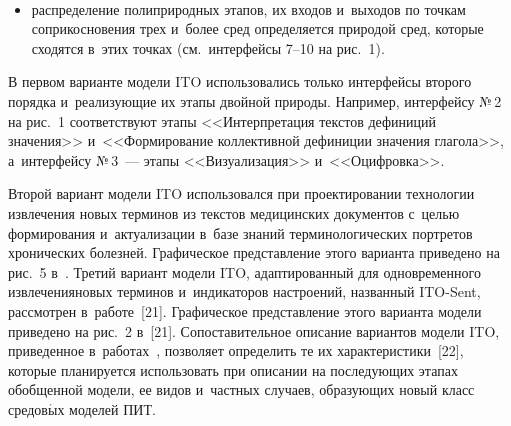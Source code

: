  \setcounter{figure}{1}
  \begin{figure*}[h] %
  \vspace*{-10pt}
  \begin{center}  
    \mbox{%
\epsfxsize=163.291mm
}

\end{center}
\vspace*{-9pt}
  \vspace*{-12pt}
  \end{figure*}
  
  \begin{multicols}{2}

\begin{itemize}
  \item распределение полиприродных этапов, их входов и~выходов по 
точкам соприкосновения трех и~более сред определяется природой сред, 
которые сходятся в~этих точках (см.\ интерфейсы 7--10 на рис.~1).
  \end{itemize}
  

  
  В первом варианте модели ITO использовались только интерфейсы 
второго порядка и~реа\-ли\-зу\-ющие их этапы двойной природы. Например,\linebreak 
интерфейсу №\,2 на рис.~1 соответствуют этапы <<Интерпретация текс\-тов 
дефиниций значения>> и~<<Формирование коллективной дефиниции 
значения глагола>>, а~интерфейсу №\,3~--- этапы <<Визуализация>> 
и~<<Оциф\-ровка>>.
  
  Второй вариант модели ITO использовался при проектировании 
технологии извлечения новых терминов из текстов медицинских документов с~\mbox{целью}
 формирования и~актуализации в~базе знаний терминологических 
портретов хронических болезней. Графическое пред\-став\-ле\-ние этого варианта 
приведено на рис.~5 в~\cite{20-zac}. Третий вариант модели ITO, 
адаптированный для одновременного извлечения\linebreak новых терминов 
и~индикаторов на\-стро\-ений, названный ITO-Sent, рассмотрен в~работе~[21]. 
Графическое пред\-став\-ле\-ние этого варианта модели приведено на рис.~2 
в~[21]. Со\-по\-ста\-ви\-тель\-ное \mbox{описание} вариантов модели ITO, приведенное 
в~работах~\cite{17-zac, 21-zac}, поз\-во\-ля\-ет определить те их 
характеристики~[22], которые планируется использовать при описании на 
по\-сле\-ду\-ющих этапах обобщенной модели, ее видов и~част\-ных случаев, 
об\-ра\-зу\-ющих новый класс средов$\acute{\mbox{ы}}$х моделей ПИТ.
  

\end{multicols}
